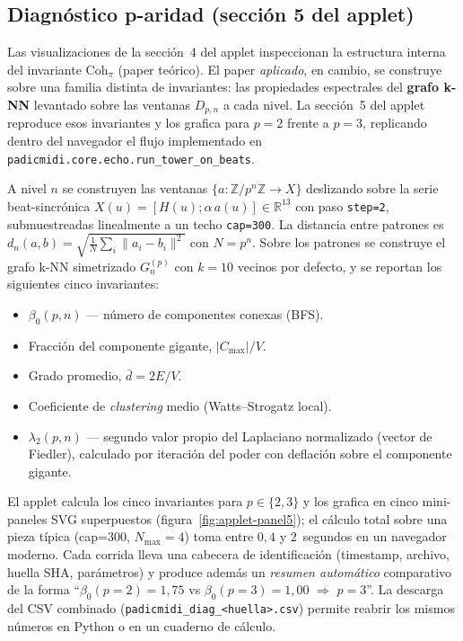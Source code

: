 \documentclass[11pt,a4paper,oneside]{article}
\theoremstyle{plain}
\theoremstyle{definition}
\theoremstyle{remark}
\newcommand{\Cohpi}{\mathrm{Coh}_\pi}
\newcommand{\code}[1]{\texttt{\small #1}}
\begin{document}
\subsection{Diagnóstico p-aridad (sección 5 del applet)}\label{sec:applet:diag}

Las visualizaciones de la sección~4 del applet inspeccionan la
estructura interna del invariante $\Cohpi$ (paper teórico). El paper
\emph{aplicado}, en cambio, se construye sobre una familia distinta de
invariantes: las propiedades espectrales del \textbf{grafo k-NN}
levantado sobre las ventanas $D_{p,n}$ a cada nivel. La sección~5 del
applet reproduce esos invariantes y los grafica para
$p=2$ frente a $p=3$, replicando dentro del navegador el flujo
implementado en \code{padicmidi.core.echo.run\_tower\_on\_beats}.

A nivel $n$ se construyen las ventanas
$\{a: \mathbb{Z}/p^n\mathbb{Z} \to X\}$ deslizando sobre la serie
beat-sincrónica $X(u)=[H(u);\alpha\,a(u)]\in\mathbb{R}^{13}$ con paso
\code{step=2}, submuestreadas linealmente a un techo \code{cap=300}.
La distancia entre patrones es
$d_n(a,b) = \sqrt{\frac{1}{N}\sum_i \|a_i-b_i\|^2}$
con $N=p^n$. Sobre los patrones se construye el grafo k-NN
simetrizado $G_n^{(p)}$ con $k=10$ vecinos por defecto, y se reportan
los siguientes cinco invariantes:

\begin{itemize}[leftmargin=1.6em,itemsep=0.2em]
  \item $\beta_0(p,n)$ --- número de componentes conexas (BFS).
  \item Fracción del componente gigante,
        $|C_{\max}|/V$.
  \item Grado promedio, $\bar{d}=2E/V$.
  \item Coeficiente de \emph{clustering} medio (Watts--Strogatz local).
  \item $\lambda_2(p,n)$ --- segundo valor propio del Laplaciano
        normalizado (vector de Fiedler), calculado por iteración del
        poder con deflación sobre el componente gigante.
\end{itemize}

El applet calcula los cinco invariantes para $p\in\{2,3\}$ y los
grafica en cinco mini-paneles SVG superpuestos
(figura~\ref{fig:applet-panel5}); el cálculo total sobre una pieza
típica (cap=300, $N_{\max}=4$) toma entre $0{,}4$ y $2$~segundos en un
navegador moderno. Cada corrida lleva una cabecera de identificación
(timestamp, archivo, huella SHA, parámetros) y produce además un
\emph{resumen automático} comparativo de la forma
``$\beta_0(p=2)=1{,}75$ vs $\beta_0(p=3)=1{,}00$ $\Rightarrow$
$p=3$''. La descarga del CSV
combinado (\code{padicmidi\_diag\_<huella>.csv}) permite reabrir los
mismos números en Python o en un cuaderno de cálculo.
\end{document}
